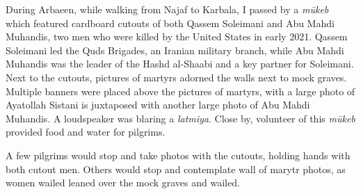 



During Arbaeen, while walking from Najaf to Karbala, I passed by a \emph{mūkeb} which featured cardboard cutouts of both Qassem Soleimani and Abu Mahdi Muhandis, two men who were killed by the United States in early 2021. Qassem Soleimani led the Quds Brigades, an Iranian military branch, while Abu Mahdi Muhandis was the leader of the Hashd al-Shaabi and a key partner for Soleimani. Next to the cutouts, pictures of martyrs adorned the walls next to mock graves. Multiple banners were placed above the pictures of martyrs, with a large photo of Ayatollah Sistani is juxtaposed with another large photo of Abu Mahdi Muhandis. A loudspeaker was blaring a \emph{latmiya}. Close by, volunteer of this \emph{mūkeb} provided food and water for pilgrims.

A few pilgrims would stop and take photos with the cutouts, holding hands with both cutout men. Others would stop and contemplate wall of marytr photos, as women wailed leaned over the mock graves and wailed.

